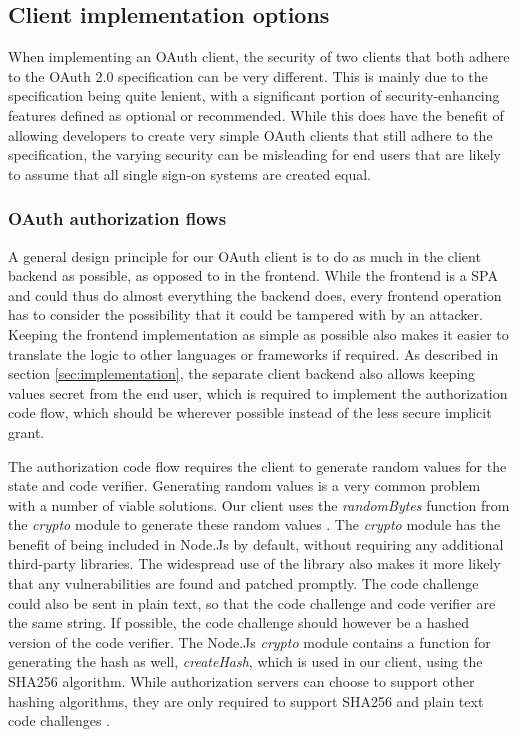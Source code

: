 \subsection{Client implementation options}
\label{sec:discussion-client-options}
When implementing an OAuth client, the security of two clients that both adhere to the OAuth 2.0 specification can be very different.
This is mainly due to the specification being quite lenient, with a significant portion of security-enhancing features defined as optional or recommended.
While this does have the benefit of allowing developers to create very simple OAuth clients that still adhere to the specification, the varying security can be misleading for end users that are likely to assume that all single sign-on systems are created equal.

\subsubsection{OAuth authorization flows}
A general design principle for our OAuth client is to do as much in the client backend as possible, as opposed to in the frontend.
While the frontend is a SPA and could thus do almost everything the backend does, every frontend operation has to consider the possibility that it could be tampered with by an attacker.
Keeping the frontend implementation as simple as possible also makes it easier to translate the logic to other languages or frameworks if required.
As described in section \ref{sec:implementation}, the separate client backend also allows keeping values secret from the end user, which is required to implement the authorization code flow, which should be wherever possible instead of the less secure implicit grant.

The authorization code flow requires the client to generate random values for the state and code verifier.
Generating random values is a very common problem with a number of viable solutions.
Our client uses the \textit{randomBytes} function from the \textit{crypto} module to generate these random values \citep{noauthor_crypto_nodate}.
The \textit{crypto} module has the benefit of being included in Node.Js by default, without requiring any additional third-party libraries.
The widespread use of the library also makes it more likely that any vulnerabilities are found and patched promptly.
The code challenge could also be sent in plain text, so that the code challenge and code verifier are the same string.
If possible, the code challenge should however be a hashed version of the code verifier.
The Node.Js \textit{crypto} module contains a function for generating the hash as well, \textit{createHash}, which is used in our client, using the SHA256 algorithm.
While authorization servers can choose to support other hashing algorithms, they are only required to support SHA256 and plain text code challenges \citep{rfc7636}.

